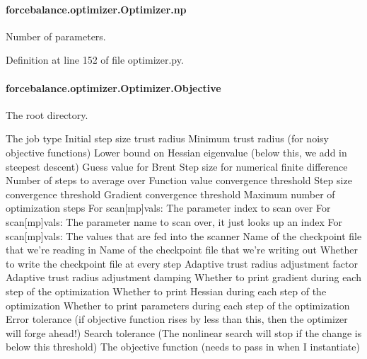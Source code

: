\hypertarget{classforcebalance_1_1optimizer_1_1Optimizer_af198da71b849e8e10611bf16ea5914cf}{
\paragraph[{np}]{\setlength{\rightskip}{0pt plus 5cm}forcebalance.\-optimizer.\-Optimizer.\-np}}\label{classforcebalance_1_1optimizer_1_1Optimizer_af198da71b849e8e10611bf16ea5914cf}


Number of parameters. 



Definition at line 152 of file optimizer.\-py.

\hypertarget{classforcebalance_1_1optimizer_1_1Optimizer_a485c636c02ff86bb7709a44582c7693e}{
\paragraph[{Objective}]{\setlength{\rightskip}{0pt plus 5cm}forcebalance.\-optimizer.\-Optimizer.\-Objective}}\label{classforcebalance_1_1optimizer_1_1Optimizer_a485c636c02ff86bb7709a44582c7693e}


The root directory. 

The job type Initial step size trust radius Minimum trust radius (for noisy objective functions) Lower bound on Hessian eigenvalue (below this, we add in steepest descent) Guess value for Brent Step size for numerical finite difference Number of steps to average over Function value convergence threshold Step size convergence threshold Gradient convergence threshold Maximum number of optimization steps For scan\mbox{[}mp\mbox{]}vals\-: The parameter index to scan over For scan\mbox{[}mp\mbox{]}vals\-: The parameter name to scan over, it just looks up an index For scan\mbox{[}mp\mbox{]}vals\-: The values that are fed into the scanner Name of the checkpoint file that we're reading in Name of the checkpoint file that we're writing out Whether to write the checkpoint file at every step Adaptive trust radius adjustment factor Adaptive trust radius adjustment damping Whether to print gradient during each step of the optimization Whether to print Hessian during each step of the optimization Whether to print parameters during each step of the optimization Error tolerance (if objective function rises by less than this, then the optimizer will forge ahead!) Search tolerance (The nonlinear search will stop if the change is below this threshold) The objective function (needs to pass in when I instantiate) 

